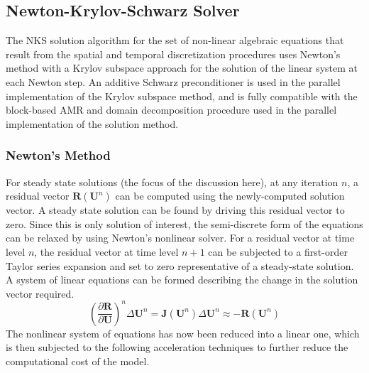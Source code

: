 \documentclass[titlepage,11pt,letterpaper]{article}
\begin{document}
\subsection{Newton-Krylov-Schwarz Solver}
The NKS solution algorithm for the set of non-linear algebraic equations that result from 
the spatial and temporal discretization procedures uses Newton's method with a Krylov 
subspace approach for the solution of the linear system at each Newton step. An additive 
Schwarz preconditioner is used in the parallel implementation of the Krylov subspace method, 
and is fully compatible with the block-based AMR and domain decomposition procedure used in 
the parallel implementation of the solution method.

\subsubsection{Newton's Method}
For steady state solutions (the focus of the discussion here), at any iteration $n$, a 
residual vector $\mathbf R(\mathbf U^n)$ can be computed using the newly-computed solution 
vector. A steady state solution can be found by driving this residual vector to zero. Since 
this is only solution of interest, the semi-discrete form of the equations can be relaxed by 
using Newton's nonlinear solver. For a residual vector at time level $n$, the residual 
vector at time level $n+1$ can be subjected to a first-order Taylor series expansion and set 
to zero representative of a steady-state solution. A system of linear equations can be 
formed describing the change in the solution vector required.
%
\begin{equation}\label{eq:NewtonMethod_2}
\left(\frac{\partial \mathbf R}{\partial \mathbf U}\right)^n\Delta \mathbf U^n
=\mathbf J\left(\mathbf U^n\right)\Delta \mathbf U^n\approx -\mathbf R\left(\mathbf U^n\right)
\end{equation}
%
The nonlinear system of equations has now been reduced into a linear one, which is then 
subjected to the following acceleration techniques to further reduce the computational 
cost of the model.

\end{document}

